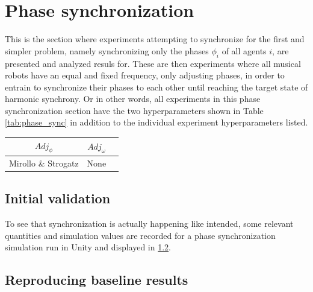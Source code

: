 



\section{Phase synchronization}
\label{sec:phase_sync}
This is the section where experiments attempting to synchronize for the first and simpler problem, namely synchronizing only the phases $\phi_i$ of all agents $i$, are presented and analyzed resuls for. These are then experiments where all musical robots have an equal and fixed frequency, only adjusting phases, in order to entrain to synchronize their phases to each other until reaching the target state of harmonic synchrony. Or in other words, all experiments in this phase synchronization section have the two hyperparameters shown in Table \ref{tab:phase_sync} in addition to the individual experiment hyperparameters listed.

\begin{center}
\begin{tabular}{ |c|c|c| } 
\hline
$Adj_\phi$ & $Adj_\omega$ \\
\hline
Mirollo \& Strogatz & None  \\
\hline
\end{tabular}
\label{tab:phase_sync}
\end{center}

	\subsection{Initial validation}
	
	To see that synchronization is actually happening like intended, some relevant quantities and simulation values are recorded for a phase synchronization simulation run in Unity and displayed in \ref{}.
	
	
	\subsection{Reproducing baseline results}
	
